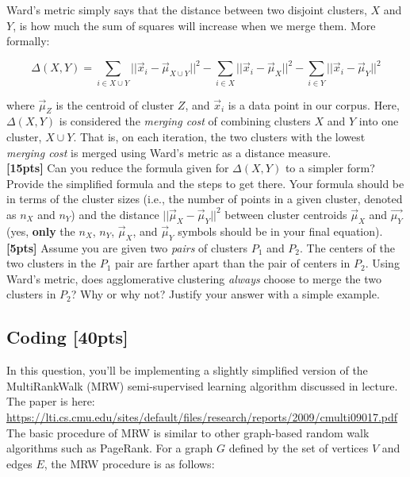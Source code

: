 \documentclass[paper=a4, fontsize=11pt]{scrartcl} %
\numberwithin{figure}{section} %
\numberwithin{table}{section} %
\begin{document}
Ward's metric simply says that the distance between two disjoint clusters, $X$ and $Y$, is how much the sum of squares will increase when we merge them. More formally:

$$
\Delta(X, Y) = \sum_{i \in X \cup Y} ||\vec{x}_i - \vec{\mu}_{X \cup Y} ||^2 - \sum_{i \in X} || \vec{x}_i - \vec{\mu}_X ||^2 - \sum_{i \in Y} || \vec{x}_i - \vec{\mu}_Y ||^2
$$

where $\vec{\mu}_Z$ is the centroid of cluster $Z$, and $\vec{x}_i$ is a data point in our corpus. Here, $\Delta(X, Y)$ is considered the \emph{merging cost} of combining clusters $X$ and $Y$ into one cluster, $X \cup Y$. That is, on each iteration, the two clusters with the lowest \emph{merging cost} is merged using Ward's metric as a distance measure. \\

\textbf{[15pts]} Can you reduce the formula given for $\Delta(X, Y)$ to a simpler form? Provide the simplified formula and the steps to get there. Your formula should be in terms of the cluster sizes (i.e., the number of points in a given cluster, denoted as $n_X$ and $n_Y$) and the distance $|| \vec{\mu}_X - \vec{\mu}_Y ||^2$ between cluster centroids $\vec{\mu}_X$ and $\vec{\mu_Y}$ (yes, \textbf{only} the $n_X$, $n_Y$, $\vec{\mu}_X$, and $\vec{\mu}_Y$ symbols should be in your final equation). \\

\textbf{[5pts]} Assume you are given two \emph{pairs} of clusters $P_1$ and $P_2$. The centers of the two clusters in the $P_1$ pair are farther apart than the pair of centers in $P_2$. Using Ward's metric, does agglomerative clustering \emph{always} choose to merge the two clusters in $P_2$? Why or why not? Justify your answer with a simple example.

\subsection{Coding \textbf{[40pts]}}

In this question, you'll be implementing a slightly simplified version of the MultiRankWalk (MRW) semi-supervised learning algorithm discussed in lecture. The paper is here: \url{https://lti.cs.cmu.edu/sites/default/files/research/reports/2009/cmulti09017.pdf} \\

The basic procedure of MRW is similar to other graph-based random walk algorithms such as PageRank. For a graph $G$ defined by the set of vertices $V$ and edges $E$, the MRW procedure is as follows:
\end{document}
